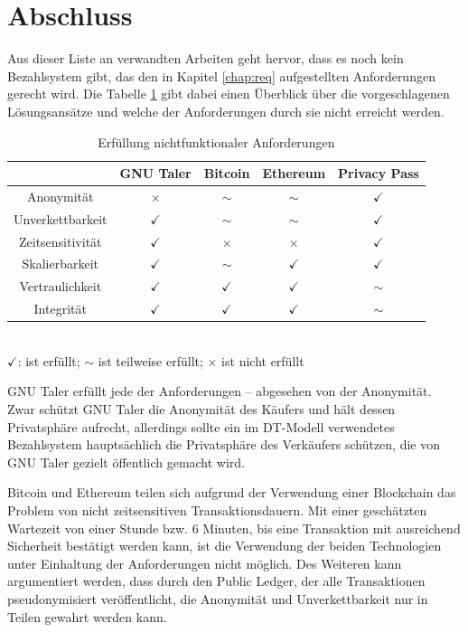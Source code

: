 \documentclass[
	fontsize=11pt,
	headings=small,
	parskip=half,           %
	bibliography=totoc,
	numbers=noenddot,       %
	open=any,               %
]{scrreprt}
\begin{document}
\section{Abschluss}
Aus dieser Liste an verwandten Arbeiten geht hervor, dass es noch kein Bezahlsystem gibt, das den in Kapitel \ref{chap:req} aufgestellten Anforderungen gerecht wird. Die Tabelle \ref{tab:nichtfunktionale_Anforderungen} gibt dabei einen Überblick über die vorgeschlagenen Lösungsansätze und welche der Anforderungen durch sie nicht erreicht werden.
\begin{table}[H]
    \centering
    \begin{tabular}{|c|c|c|c|c|}
        \hline
        & GNU Taler & Bitcoin & Ethereum & Privacy Pass \\
        \hline
        Anonymität & $\times$  & $\mathtt{\sim}$ & $\mathtt{\sim}$ & $\checkmark$ \\
        \hline
        Unverkettbarkeit & $\checkmark$  & $\mathtt{\sim}$ & $\mathtt{\sim}$ & $\checkmark$ \\
        \hline
        Zeitsensitivität & $\checkmark$ & $\times$ & $\times$ & $\checkmark$ \\
        \hline
        Skalierbarkeit & $\checkmark$ & $\mathtt{\sim}$ & $\checkmark$  & $\checkmark$\\
        \hline
        Vertraulichkeit & $\checkmark$ & $\checkmark$ & $\checkmark$ & $\mathtt{\sim}$ \\
        \hline
        Integrität & $\checkmark$ & $\checkmark$ & $\checkmark$ & $\mathtt{\sim}$ \\
        \hline
    \end{tabular}\\
    \vspace{5pt}
    $\checkmark$: ist erfüllt; $\mathtt{\sim}$ ist teilweise erfüllt; $\times$ ist nicht erfüllt
    \caption{Erfüllung nichtfunktionaler Anforderungen}
    \label{tab:nichtfunktionale_Anforderungen}
\end{table}
GNU Taler erfüllt jede der Anforderungen -- abgesehen von der Anonymität. Zwar schützt GNU Taler die Anonymität des Käufers und hält dessen Privatsphäre aufrecht, allerdings sollte ein im DT-Modell verwendetes Bezahlsystem hauptsächlich die Privatsphäre des Verkäufers schützen, die von GNU Taler gezielt öffentlich gemacht wird.

Bitcoin und Ethereum teilen sich aufgrund der Verwendung einer Blockchain das Problem von nicht zeitsensitiven Transaktionsdauern. Mit einer geschätzten Wartezeit von einer Stunde bzw. 6 Minuten, bis eine Transaktion mit ausreichend Sicherheit bestätigt werden kann, ist die Verwendung der beiden Technologien unter Einhaltung der Anforderungen nicht möglich. Des Weiteren kann argumentiert werden, dass durch den Public Ledger, der alle Transaktionen pseudonymisiert veröffentlicht, die Anonymität und Unverkettbarkeit nur in Teilen gewahrt werden kann. 
\end{document}
